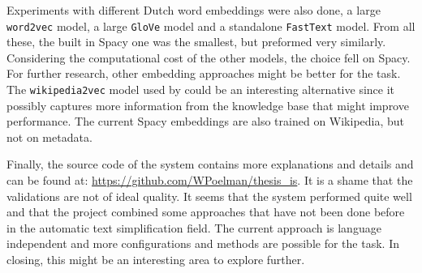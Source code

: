 \documentclass[
10pt, %
a4paper, %
oneside, %
headinclude,footinclude, %
] {book}%
\begin{document}
Experiments with different Dutch word embeddings were also done, a large \verb+word2vec+ model, a large \verb+GloVe+ model and a standalone \verb+FastText+ model.
From all these, the built in Spacy one was the smallest, but preformed very similarly. 
Considering the computational cost of the other models, the choice fell on Spacy.
For further research, other embedding approaches might be better for the task.
The \verb+wikipedia2vec+ model used by \cite{vanhulst2020} could be an interesting alternative since it possibly captures more information from the knowledge base that might improve performance.
The current Spacy embeddings are also trained on Wikipedia, but not on metadata.

Finally, the source code of the system contains more explanations and details and can be found at: \url{https://github.com/WPoelman/thesis_is}.
It is a shame that the validations are not of ideal quality.
It seems that the system performed quite well and that the project combined some approaches that have not been done before in the automatic text simplification field.
The current approach is language independent and more configurations and methods are possible for the task.
In closing, this might be an interesting area to explore further.




\end{document}
